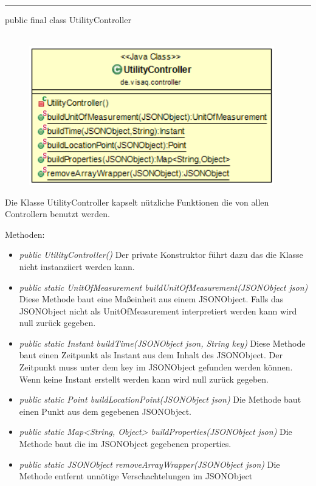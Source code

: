 \rule{\textwidth}{0.4pt}
public final class UtilityController
\\\\
\begin{minipage}{0.5\textwidth}
    \begin{figure}[H]
        {\centering\includegraphics[width=0.95\textwidth]{media/backend/controller/classes/UtilityController.png}}
    \end{figure}
    \end{minipage} \hfill
\begin{minipage}{0.5\textwidth}
    Die Klasse UtilityController kapselt nützliche Funktionen die von allen Controllern benutzt werden.
\end{minipage}

Methoden:
\begin{itemize}
    \item \emph{public UtilityController()}
    Der private Konstruktor führt dazu das die Klasse nicht instanziiert werden kann.
    \item \emph{public static UnitOfMeasurement buildUnitOfMeasurement(JSONObject json)}
    Diese Methode baut eine Maßeinheit aus einem JSONObject. Falls das JSONObject nicht als UnitOfMeasurement interpretiert werden kann wird null zurück gegeben.
    \item \emph{public static Instant buildTime(JSONObject json, String key)}
    Diese Methode baut einen Zeitpunkt als Instant aus dem Inhalt des JSONObject. Der Zeitpunkt muss unter dem key im JSONObject gefunden werden können.
    Wenn keine Instant erstellt werden kann wird null zurück gegeben.
    \item \emph{public static Point buildLocationPoint(JSONObject json)}
    Die Methode baut einen Punkt aus dem gegebenen JSONObject.
    \item \emph{public static Map<String, Object> buildProperties(JSONObject json)}
    Die Methode baut die im JSONObject gegebenen properties.
    \item \emph{public static JSONObject removeArrayWrapper(JSONObject json)}
    Die Methode entfernt unnötige Verschachtelungen im JSONObject 
\end{itemize}